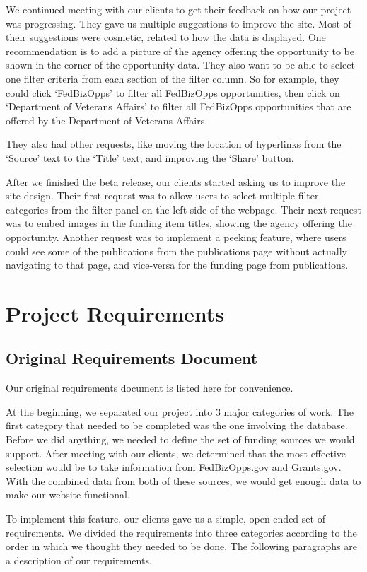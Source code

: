 \documentclass[onecolumn]{IEEEtran}
\begin{document}
We continued meeting with our clients to get their feedback on how our project was progressing. They gave us multiple suggestions to improve the site. Most of their suggestions were cosmetic, related to how the data is displayed. One recommendation is to add a picture of the agency offering the opportunity to be shown in the corner of the opportunity data. They also want to be able to select one filter criteria from each section of the filter column. So for example, they could click `FedBizOpps' to filter all FedBizOpps opportunities, then click on `Department of Veterans Affairs' to filter all FedBizOpps opportunities that are offered by the Department of Veterans Affairs. 

They also had other requests, like moving the location of hyperlinks from the `Source' text to the `Title' text, and improving the `Share' button. 

After we finished the beta release, our clients started asking us to improve the site design. Their first request was to allow users to select multiple filter categories from the filter panel on the left side of the webpage. Their next request was to embed images in the funding item titles, showing the agency offering the opportunity. Another request was to implement a peeking feature, where users could see some of the publications from the publications page without actually navigating to that page, and vice-versa for the funding page from publications. 

\section{Project Requirements}
\subsection{Original Requirements Document}
Our original requirements document is listed here for convenience.

At the beginning, we separated our project into 3 major categories of work. The first category that needed to be completed was the one involving the database. Before we did anything, we needed to define the set of funding sources we would support. After meeting with our clients, we determined that the most effective selection would be to take information from FedBizOpps.gov and Grants.gov. With the combined data from both of these sources, we would get enough data to make our website functional. 

To implement this feature, our clients gave us a simple, open-ended set of requirements. We divided the requirements into three categories according to the order in which we thought they needed to be done. The following paragraphs are a description of our requirements. 
\end{document}
